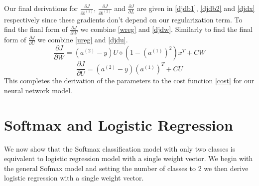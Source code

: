 \documentclass{article}
\begin{document}
Our final derivations for \(\frac{\partial J}{\partial b^{(1)}}\), \(\frac{\partial J}{\partial b^{(2)}}\) and \(\frac{\partial J}{\partial L}\) are given in \eqref{djdb1}, \eqref{djdb2} and \eqref{djdx} respectively since these gradients don't depend on our regularization term.  To find the final form of \(\frac{\partial J}{\partial W}\) we combine \eqref{wreg} and \eqref{djdw}.  Similarly to find the final form of \(\frac{\partial J}{\partial U}\) we combine \eqref{ureg} and \eqref{djdu}.
\begin{equation}
\frac{\partial J}{\partial W} = \left(a^{(2)} - y\right) U \diamond\left( 1-(a^{(1)})^2 \right) x^T +CW
\end{equation}
\begin{equation}
\frac{\partial J}{\partial U} = \left(a^{(2)} - y\right)(a^{(1)})^T + CU
\end{equation}
This completes the derivation of the parameters to the cost function \eqref{cost} for our neural network model.

\section{Softmax and Logistic Regression}\label{softmaxproof}

We now show that the Softmax classification model with only two classes is equivalent to logistic regression model with a single weight vector.  We begin with the general Sofmax model and setting the number of classes to 2 we then derive logistic regression with a single weight vector.
\end{document}
